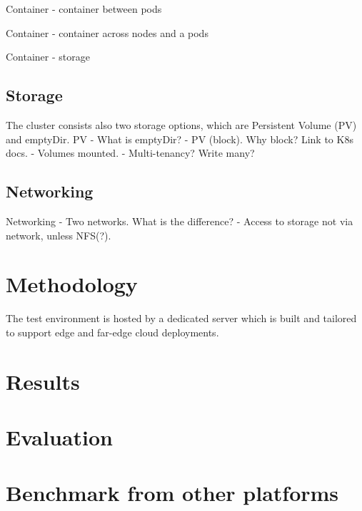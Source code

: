 Container - container between pods

Container - container across nodes and a pods

Container - storage

\subsection{Storage}

The cluster consists also two storage options, which are Persistent Volume (PV) and emptyDir. PV 
    - What is emptyDir?
    - PV (block). Why block? Link to K8s docs.
    - Volumes mounted.
    - Multi-tenancy? Write many?

\subsection{Networking}

Networking
    - Two networks. What is the difference?
    - Access to storage not via network, unless NFS(?).













\section{Methodology}

The test environment is hosted by a dedicated server which is built and tailored to support edge and far-edge cloud deployments.


\section{Results}

\section{Evaluation}

\section{Benchmark from other platforms}
